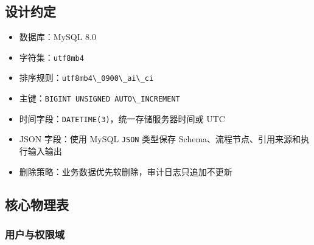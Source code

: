 \documentclass[a4paper,zihao=-4]{ctexart}
\providecommand{\tightlist}{%
  \setlength{\itemsep}{0pt}\setlength{\parskip}{0pt}}
\providecommand{\passthrough}[1]{#1}
\begin{document}
\hypertarget{ux8bbeux8ba1ux7ea6ux5b9a}{%
\subsection{设计约定}\label{ux8bbeux8ba1ux7ea6ux5b9a}}

\begin{itemize}
\tightlist
\item
  数据库：MySQL 8.0
\item
  字符集：\passthrough{\lstinline!utf8mb4!}
\item
  排序规则：\passthrough{\lstinline!utf8mb4\_0900\_ai\_ci!}
\item
  主键：\passthrough{\lstinline!BIGINT UNSIGNED AUTO\_INCREMENT!}
\item
  时间字段：\passthrough{\lstinline!DATETIME(3)!}，统一存储服务器时间或
  UTC
\item
  JSON 字段：使用 MySQL \passthrough{\lstinline!JSON!} 类型保存
  Schema、流程节点、引用来源和执行输入输出
\item
  删除策略：业务数据优先软删除，审计日志只追加不更新
\end{itemize}

\hypertarget{ux6838ux5fc3ux7269ux7406ux8868}{%
\subsection{核心物理表}\label{ux6838ux5fc3ux7269ux7406ux8868}}

\hypertarget{ux7528ux6237ux4e0eux6743ux9650ux57df}{%
\subsubsection{用户与权限域}\label{ux7528ux6237ux4e0eux6743ux9650ux57df}}
\end{document}

